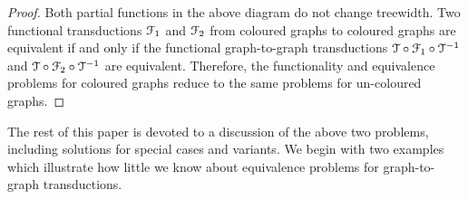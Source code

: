 \begin{proof}
    Both partial functions in the above diagram do not change treewidth. 
    Two functional \mso transductions ${\mathcal F}_1$ and ${\mathcal F}_2$  from coloured graphs to coloured graphs are equivalent if and only if the functional graph-to-graph \mso transductions  ${\mathcal T} \circ {\mathcal F}_1 \circ {\mathcal T}^{-1}$ and ${\mathcal T} \circ {\mathcal F}_2 \circ {\mathcal T}^{-1}$ are equivalent. 
     Therefore, the functionality and equivalence problems for coloured graphs reduce to the same problems for un-coloured graphs.
\end{proof}

The rest of this paper is devoted to a discussion of the above two problems, including solutions for special cases and variants. We begin with two examples which illustrate how little we know about equivalence problems for graph-to-graph transductions.


